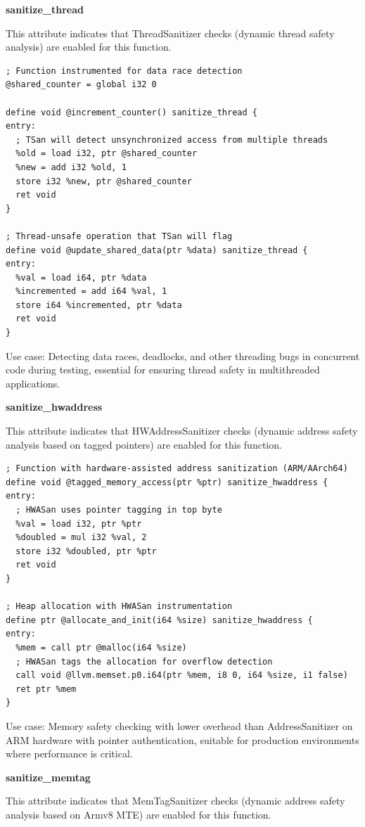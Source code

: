 \textbf{sanitize\_thread}

This attribute indicates that ThreadSanitizer checks (dynamic thread safety analysis) are enabled for this function.

\begin{lstlisting}[style=ir]
; Function instrumented for data race detection
@shared_counter = global i32 0

define void @increment_counter() sanitize_thread {
entry:
  ; TSan will detect unsynchronized access from multiple threads
  %old = load i32, ptr @shared_counter
  %new = add i32 %old, 1
  store i32 %new, ptr @shared_counter
  ret void
}

; Thread-unsafe operation that TSan will flag
define void @update_shared_data(ptr %data) sanitize_thread {
entry:
  %val = load i64, ptr %data
  %incremented = add i64 %val, 1
  store i64 %incremented, ptr %data
  ret void
}
\end{lstlisting}

Use case: Detecting data races, deadlocks, and other threading bugs in concurrent code during testing, essential for ensuring thread safety in multithreaded applications.

\textbf{sanitize\_hwaddress}

This attribute indicates that HWAddressSanitizer checks (dynamic address safety analysis based on tagged pointers) are enabled for this function.

\begin{lstlisting}[style=ir]
; Function with hardware-assisted address sanitization (ARM/AArch64)
define void @tagged_memory_access(ptr %ptr) sanitize_hwaddress {
entry:
  ; HWASan uses pointer tagging in top byte
  %val = load i32, ptr %ptr
  %doubled = mul i32 %val, 2
  store i32 %doubled, ptr %ptr
  ret void
}

; Heap allocation with HWASan instrumentation
define ptr @allocate_and_init(i64 %size) sanitize_hwaddress {
entry:
  %mem = call ptr @malloc(i64 %size)
  ; HWASan tags the allocation for overflow detection
  call void @llvm.memset.p0.i64(ptr %mem, i8 0, i64 %size, i1 false)
  ret ptr %mem
}
\end{lstlisting}

Use case: Memory safety checking with lower overhead than AddressSanitizer on ARM hardware with pointer authentication, suitable for production environments where performance is critical.

\textbf{sanitize\_memtag}

This attribute indicates that MemTagSanitizer checks (dynamic address safety analysis based on Armv8 MTE) are enabled for this function.

